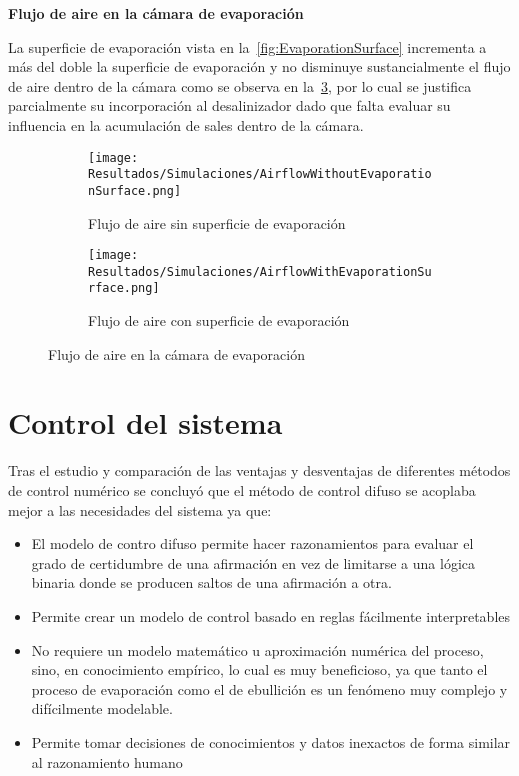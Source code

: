 				
				\textbf{Flujo de aire en la cámara de evaporación}\par
			
				La superficie de evaporación vista en la~\cref{fig:EvaporationSurface} incrementa a más del doble la superficie de evaporación y no disminuye sustancialmente el flujo de aire dentro de la cámara como se observa en la~\cref{fig:AirflowInEvaporationChamber}, por lo cual se justifica parcialmente su incorporación al desalinizador dado que falta evaluar su influencia en la acumulación de sales dentro de la cámara.
				
				\begin{figure}[H]
					\centering
					\begin{subfigure}[t]{0.45\linewidth}
						\centering
						\texttt{[image: Resultados/Simulaciones/AirflowWithoutEvaporationSurface.png]}
						\caption{Flujo de aire sin superficie de evaporación}
						\label{fig:AirflowWithoutEvaporationSurface}
					\end{subfigure}
					\hfill
					\begin{subfigure}[t]{0.45\linewidth}
						\centering
						\texttt{[image: Resultados/Simulaciones/AirflowWithEvaporationSurface.png]}
						\caption{Flujo de aire con superficie de evaporación}
						\label{fig:AirflowWithEvaporationSurface}
					\end{subfigure}
					\caption{Flujo de aire en la cámara de evaporación}
					\label{fig:AirflowInEvaporationChamber}
				\end{figure}
		
			
				
				
	\section{Control del sistema}
	
		Tras el estudio y comparación de las ventajas y desventajas de diferentes métodos de control numérico se concluyó que el método de control difuso se acoplaba mejor a las necesidades del sistema ya que:
		
		\begin{itemize}
			\item El modelo de contro difuso permite hacer razonamientos para evaluar el grado de certidumbre de una afirmación en vez de limitarse a una lógica binaria donde se producen saltos de una afirmación a otra.
			\item Permite crear un modelo de control basado en reglas fácilmente interpretables
			\item No requiere un modelo matemático u aproximación numérica del proceso, sino, en conocimiento empírico, lo cual es muy beneficioso, ya que tanto el proceso de evaporación como el de ebullición es un fenómeno muy complejo y difícilmente modelable.
			\item Permite tomar decisiones de conocimientos y datos inexactos de forma similar al razonamiento humano
		\end{itemize}
		
